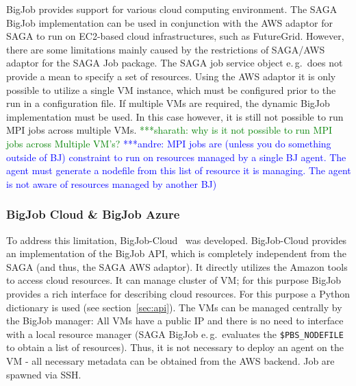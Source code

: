 \documentclass[]{article}
\newcommand{\alnote}[1]{ {\textcolor{blue} { ***andre: #1 }}}
\newcommand{\smnote}[1]{ {\textcolor{green} { ***sharath: #1 }}}
\newcommand{\alnote}[1]{}
\newcommand{\smnote}[1]{}
\begin{document}
BigJob provides support for various cloud computing environment. The SAGA BigJob
implementation can be used in conjunction with the AWS adaptor for SAGA to run
on EC2-based cloud infrastructures, such as FutureGrid. However, there are some 
limitations mainly caused by the restrictions of SAGA/AWS adaptor for the SAGA 
Job package. The SAGA job service object e.\,g.\ does not provide a mean to 
specify a set of resources. Using the AWS adaptor it is only possible to utilize 
a single VM instance, which must be configured prior to the run in a 
configuration file. If multiple VMs are required, the dynamic BigJob 
implementation must be used. In this case however, it is still not possible to 
run MPI jobs across multiple VMs. 
\smnote {why is it not possible to run MPI jobs across Multiple VM's?} \alnote{MPI jobs are (unless you do something outside of BJ) constraint to run
on resources managed by a single BJ agent. The agent must generate a nodefile
from this list of resource it is managing. The agent is not aware of resources
managed by another BJ)}

\subsubsection{BigJob Cloud \& BigJob Azure}

To address this limitation, BigJob-Cloud~\cite{saga_bigjob_condor_cloud} was
developed. BigJob-Cloud provides an implementation of the BigJob API, which is
completely independent from the SAGA (and thus, the SAGA AWS adaptor). It
directly utilizes the Amazon tools to access cloud resources. It can manage
cluster of VM; for this purpose BigJob provides a rich interface for describing
cloud resources. For this purpose a Python dictionary is used (see
section~\ref{sec:api}). The VMs can be managed centrally by the BigJob manager:
All VMs have a public IP and there is no need to interface with a local resource
manager (SAGA BigJob e.\,g.\ evaluates the \texttt{\$PBS\_NODEFILE} to obtain a
list of resources). Thus, it is not necessary to deploy an agent on the VM - all
necessary metadata can be obtained from the AWS backend. Job are spawned via
SSH.

\end{document}
